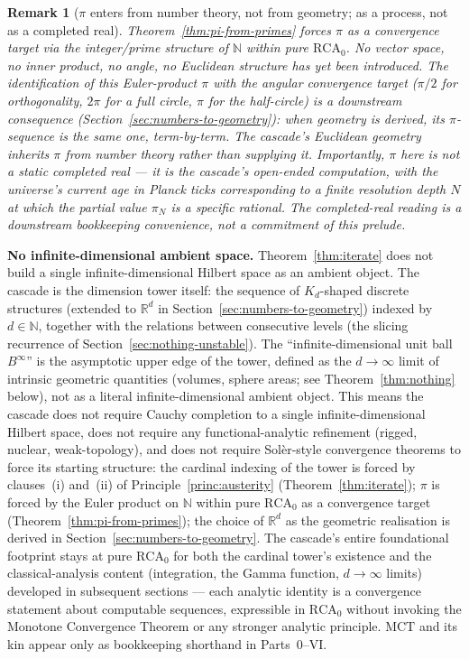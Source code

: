 \documentclass[11pt,a4paper]{article}
\newtheorem{remark}[theorem]{Remark}
\begin{document}
\begin{remark}[$\pi$ enters from number theory, not from geometry; as a process, not as a completed real]
Theorem~\ref{thm:pi-from-primes} forces $\pi$ as a convergence
target via the integer/prime structure of $\mathbb{N}$ within
pure $\mathrm{RCA}_0$. No vector space, no inner product, no angle,
no Euclidean structure has yet been introduced. The identification
of this Euler-product $\pi$ with the angular convergence target
($\pi/2$ for orthogonality, $2\pi$ for a full circle, $\pi$ for the
half-circle) is a downstream consequence
(Section~\ref{sec:numbers-to-geometry}): when geometry is derived,
its $\pi$-sequence is the same one, term-by-term. The cascade's
Euclidean geometry inherits $\pi$ from number theory rather than
supplying it. Importantly, $\pi$ here is not a static completed
real --- it is the cascade's open-ended computation, with the
universe's current age in Planck ticks corresponding to a finite
resolution depth $N$ at which the partial value $\pi_N$ is a
specific rational. The completed-real reading is a downstream
bookkeeping convenience, not a commitment of this prelude.
\end{remark}

\noindent\textbf{No infinite-dimensional ambient space.} Theorem~\ref{thm:iterate}
does not build a single infinite-dimensional Hilbert space as an
ambient object. The cascade is the dimension tower itself: the
sequence of $K_d$-shaped discrete structures (extended to
$\mathbb{R}^d$ in Section~\ref{sec:numbers-to-geometry}) indexed by
$d\in\mathbb{N}$, together with the relations between consecutive
levels (the slicing recurrence of
Section~\ref{sec:nothing-unstable}). The
``infinite-dimensional unit ball $B^\infty$'' is the asymptotic upper
edge of the tower, defined as the $d\to\infty$ limit of intrinsic
geometric quantities (volumes, sphere areas; see
Theorem~\ref{thm:nothing} below), not as a literal
infinite-dimensional ambient object. This means the cascade does not
require Cauchy completion to a single infinite-dimensional Hilbert
space, does not require any functional-analytic refinement (rigged,
nuclear, weak-topology), and does not require Sol\`er-style
convergence theorems to force its starting structure: the cardinal
indexing of the tower is forced by clauses~(i) and~(ii) of
Principle~\ref{princ:austerity} (Theorem~\ref{thm:iterate}); $\pi$
is forced by the Euler product on $\mathbb{N}$ within pure
$\mathrm{RCA}_0$ as a convergence target
(Theorem~\ref{thm:pi-from-primes}); the choice of $\mathbb{R}^d$ as
the geometric realisation is derived in
Section~\ref{sec:numbers-to-geometry}. The cascade's entire
foundational footprint stays at pure $\mathrm{RCA}_0$ for both the
cardinal tower's existence and the classical-analysis content
(integration, the Gamma function, $d\to\infty$ limits) developed in
subsequent sections --- each analytic identity is a convergence
statement about computable sequences, expressible in $\mathrm{RCA}_0$
without invoking the Monotone Convergence Theorem or any stronger
analytic principle. $\mathrm{MCT}$ and its kin appear only as
bookkeeping shorthand in Parts~0--VI.
\end{document}

